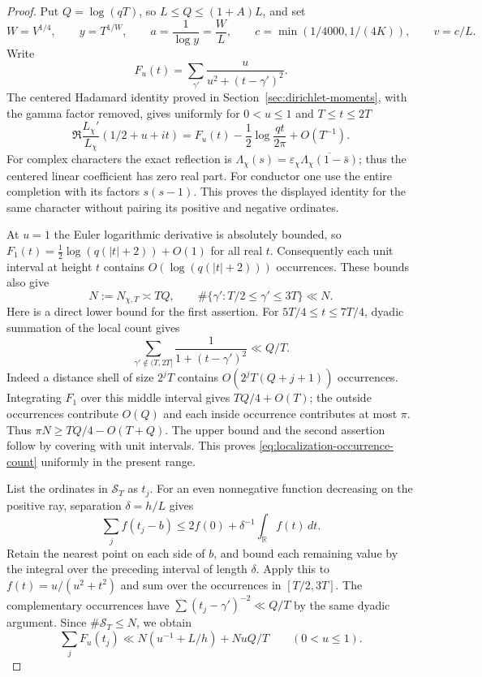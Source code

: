 \begin{proof}
Put $Q=\log(qT)$, so $L\le Q\le(1+A)L$, and set
\[
 W=V^{1/4},\qquad y=T^{1/W},\qquad a=\frac1{\log y}=\frac WL,
 \qquad c=\min(1/4000,1/(4K)),\qquad v=c/L.
\]
Write
\[
 F_u(t)=\sum_{\gamma'}\frac{u}{u^2+(t-\gamma')^2}.
\]
The centered Hadamard identity proved in
Section~\ref{sec:dirichlet-moments}, with the gamma factor removed,
gives uniformly for $0<u\le1$ and $T\le t\le2T$
\begin{equation}\label{eq:localization-real-log-derivative}
 \Re\frac{L_\chi'}{L_\chi}(1/2+u+it)
     =F_u(t)-\frac12\log\frac{qt}{2\pi}+O(T^{-1}).
\end{equation}
For complex characters the exact reflection is
$\Lambda_\chi(s)=\varepsilon_\chi
\overline{\Lambda_\chi(1-\bar s)}$; thus the centered linear
coefficient has zero real part. For conductor one use the entire
completion with its factors $s(s-1)$. This proves the displayed
identity for the same character without pairing its positive and
negative ordinates.

At $u=1$ the Euler logarithmic derivative is absolutely bounded,
so $F_1(t)=\tfrac12\log(q(|t|+2))+O(1)$ for all real $t$.
Consequently each unit interval at height $t$ contains
$O(\log(q(|t|+2)))$ occurrences. These bounds also give
\begin{equation}\label{eq:localization-occurrence-count}
 N:=N_{\chi,T}\asymp TQ,\qquad
 \#\{\gamma':T/2\le\gamma'\le3T\}\ll N.
\end{equation}
Here is a direct lower bound for the first assertion. For
$5T/4\le t\le7T/4$, dyadic summation of the local count gives
\[
 \sum_{\gamma'\notin(T,2T]}
       \frac1{1+(t-\gamma')^2}\ll Q/T.
\]
Indeed a distance shell of size $2^jT$ contains
$O(2^jT(Q+j+1))$ occurrences. Integrating $F_1$ over this middle
interval gives $TQ/4+O(T)$; the outside occurrences contribute
$O(Q)$ and each inside occurrence contributes at most $\pi$.
Thus $\pi N\ge TQ/4-O(T+Q)$. The upper bound and the second
assertion follow by covering with unit intervals. This proves
\eqref{eq:localization-occurrence-count} uniformly in the present
range.

List the ordinates in $\mathcal S_T$ as $t_j$. For an even
nonnegative function decreasing on the positive ray, separation
$\delta=h/L$ gives
\[
 \sum_j f(t_j-b)\le2f(0)+\delta^{-1}\int_{\mathbb R}f(t)\,dt.
\]
Retain the nearest point on each side of $b$, and bound each
remaining value by the integral over the preceding interval of length
$\delta$. Apply this to $f(t)=u/(u^2+t^2)$ and sum over the
occurrences in $[T/2,3T]$. The complementary occurrences have
$\sum(t_j-\gamma')^{-2}\ll Q/T$ by the same dyadic argument.
Since $\#\mathcal S_T\le N$, we obtain
\begin{equation}\label{eq:localization-summed-kernel}
 \sum_jF_u(t_j)\ll
 N\left(u^{-1}+L/h\right)+NuQ/T\qquad(0<u\le1).
\end{equation}


\end{proof}
